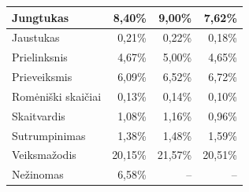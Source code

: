 \documentclass{VUMIFInfBakalaurinis}
\begin{document}
\begin{table}[H]
\begin{tabular}{|l|r|r|r|}
Jungtukas                 & 8,40\%                          & 9,00\%                                                                                         & 7,62\%                                                                                     \\ \hline
Jaustukas                 & 0,21\%                          & 0,22\%                                                                                         & 0,18\%                                                                                     \\ \hline
Prielinksnis              & 4,67\%                          & 5,00\%                                                                                         & 4,65\%                                                                                     \\ \hline
Prieveiksmis              & 6,09\%                          & 6,52\%                                                                                         & 6,72\%                                                                                     \\ \hline
Romėniški skaičiai        & 0,13\%                          & 0,14\%                                                                                         & 0,10\%                                                                                     \\ \hline
Skaitvardis               & 1,08\%                          & 1,16\%                                                                                         & 0,96\%                                                                                     \\ \hline
Sutrumpinimas             & 1,38\%                          & 1,48\%                                                                                         & 1,59\%                                                                                     \\ \hline
Veiksmažodis              & 20,15\%                         & 21,57\%                                                                                        & 20,51\%                                                                                    \\ \hline
Nežinomas                 & 6,58\%                          & --                                                                                             & --                                                                                         \\ \hline
\end{tabular}
\end{table}
\end{document}
